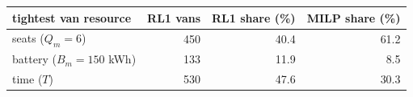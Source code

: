 \begin{tabular}{@{}lrrr@{}}
\toprule
tightest van resource & RL1 vans & RL1 share (\%) & MILP share (\%) \\
\midrule
seats ($Q_m=6$) & 450 & 40.4 & 61.2 \\
battery ($B_m=150$ kWh) & 133 & 11.9 & 8.5 \\
time ($T$) & 530 & 47.6 & 30.3 \\
\bottomrule
\end{tabular}
